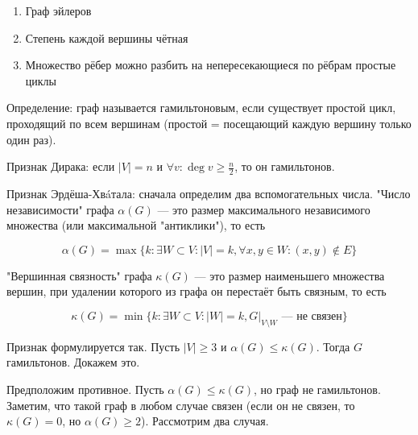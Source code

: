 \documentclass[12pt]{article}
\begin{document}
\begin{enumerate}
\item Граф эйлеров
\item Степень каждой вершины чётная
\item Множество рёбер можно разбить на непересекающиеся по рёбрам простые циклы
\end{enumerate}

Определение: граф называется гамильтоновым, если существует простой цикл, проходящий по всем вершинам (простой = посещающий каждую вершину только один раз).

Признак Дирака: если $|V| = n$ и $\forall v \colon \operatorname{deg} v \geq \frac n 2$, то он гамильтонов.

Признак Эрдёша-Хвáтала: сначала определим два вспомогательных числа. "Число независимости" графа $\alpha (G)$ — это размер максимального независимого множества (или максимальной "антиклики"), то есть

\[
\alpha(G) = \max \{ k \colon \exists W \subset V \colon |V| = k, \forall x, y \in W \colon (x, y) \not\in E \}
\]

"Вершинная связность" графа $\kappa (G)$ — это размер наименьшего множества вершин, при удалении которого из графа он перестаёт быть связным, то есть

\[
\kappa (G) = \min \{ k \colon \exists W \subset V \colon |W| = k, G|_{V \setminus W} \text{ — не связен} \}
\]

Признак формулируется так. Пусть $|V| \geq 3$ и $\alpha(G) \leq \kappa(G)$. Тогда $G$ гамильтонов. Докажем это.

Предположим противное. Пусть $\alpha(G) \leq \kappa(G)$, но граф не гамильтонов. Заметим, что такой граф в любом случае связен (если он не связен, то $\kappa(G) = 0$, но $\alpha(G) \geq 2$). Рассмотрим два случая.
\end{document}
